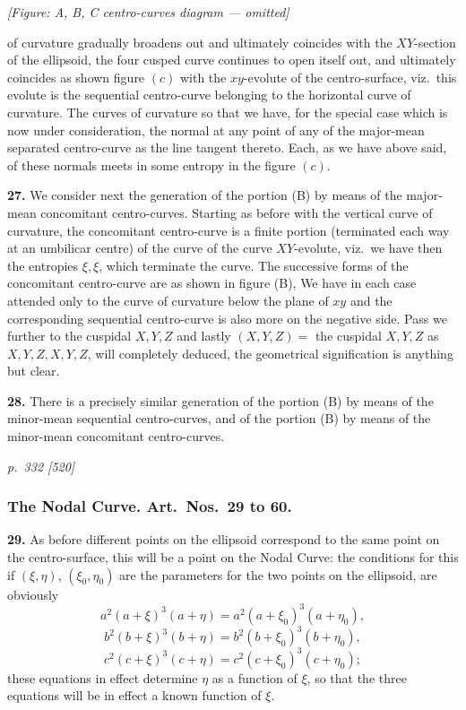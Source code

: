 \documentclass[11pt,a4paper]{book}
\begin{document}
\begin{center}
\textit{[Figure: A, B, C centro-curves diagram --- omitted]}
\end{center}

of curvature gradually broadens out and ultimately coincides with the $XY$-section of the ellipsoid, the four cusped curve continues to open itself out, and ultimately coincides as shown figure $(c)$ with the $xy$-evolute of the centro-surface, viz.\ this evolute is the sequential centro-curve belonging to the horizontal curve of curvature. The curves of curvature so that we have, for the special case which is now under consideration, the normal at any point of any of the major-mean separated centro-curve as the line tangent thereto. Each, as we have above said, of these normals meets in some entropy in the figure $(c)$.

\textbf{27.} We consider next the generation of the portion (B) by means of the major-mean concomitant centro-curves. Starting as before with the vertical curve of curvature, the concomitant centro-curve is a finite portion (terminated each way at an umbilicar centre) of the curve of the curve $XY$-evolute, viz.\ we have then the entropies $\xi, \xi$, which terminate the curve. The successive forms of the concomitant centro-curve are as shown in figure (B), We have in each case attended only to the curve of curvature below the plane of $xy$ and the corresponding sequential centro-curve is also more on the negative side. Pass we further to the cuspidal $X, Y, Z$ and lastly $(X, Y, Z) = $ the cuspidal $X, Y, Z$ as $X, Y, Z, X, Y, Z$, will completely deduced, the geometrical signification is anything but clear.

\textbf{28.} There is a precisely similar generation of the portion (B) by means of the minor-mean sequential centro-curves, and of the portion (B) by means of the minor-mean concomitant centro-curves.

\clearpage

\bigskip
\textit{p.~332 [520]}
\smallskip

\subsubsection*{The Nodal Curve. Art.\ Nos.\ 29 to 60.}

\textbf{29.} As before different points on the ellipsoid correspond to the same point on the centro-surface, this will be a point on the Nodal Curve: the conditions for this if $(\xi,\eta)$, $(\xi_0, \eta_0)$ are the parameters for the two points on the ellipsoid, are obviously
\[
a^2(a + \xi)^3(a + \eta) = a^2(a + \xi_0)^3(a + \eta_0),
\]
\[
b^2(b + \xi)^3(b + \eta) = b^2(b + \xi_0)^3(b + \eta_0),
\]
\[
c^2(c + \xi)^3(c + \eta) = c^2(c + \xi_0)^3(c + \eta_0);
\]
these equations in effect determine $\eta$ as a function of $\xi$, so that the three equations will be in effect a known function of $\xi$.
\end{document}
